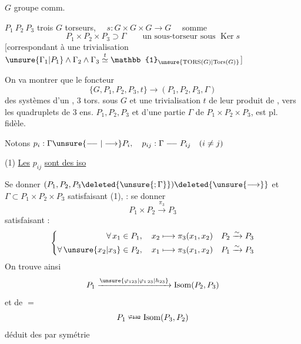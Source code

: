 \(G\) groupe comm.

\(P_1\ P_2\ P_3\) trois \(G\) torseurs, \(\quad s:G\times G\times G\longrightarrow G\quad\)  somme
\[
 P_1\times P_2\times P_3\supset \Gamma\qquad\text{un sous-torseur sous }\operatorname{Ker}s
\]
[correspondant à une trivialisation \(\unsure{\Gamma_1|P_1}\wedge \Gamma_2\wedge \Gamma_3\overset{t}{\simeq}\mathbb{1}_{\unsure{\mathrm{TORS}(G)|\mathrm{Tors}(G)}}\)]

On va montrer que le foncteur
\[
 \{G,P_1,P_2,P_3,t\}\longrightarrow(P_1,P_2,P_3,\Gamma)
\]
 des systèmes d'un  , \(3\) tors.  sous \(G\) et une trivialisation \(t\) de leur produit de , vers les quadruplets de \(3\) ens. \(P_1,P_2,P_3\) et d'une partie \(\Gamma\) de \(P_1\times P_2\times P_3\), est pl. fidèle.

Notons \(p_i:\Gamma\unsure{\relbar\joinrel\relbar|\longrightarrow} P_i,\quad p_{ij}:\Gamma\relbar\joinrel\relbar P_{ij}\quad(i\ne j)\)

(1) \uline{Les} \(p_{ij}\) \uline{sont des iso}

Se donner \((P_1,P_2,P_3\deleted{\unsure{;\Gamma}})\deleted{\unsure{\longrightarrow}}\) et \(\Gamma\subset P_1\times P_2\times P_3\) satisfaisant (1),  : se donner
\[
 P_1\times P_2\xrightarrow{\pi_3}P_3
\]
satisfaisant :
\[
 \left\{\begin{aligned}
 \forall\,x_1\in P_1,\quad x_2&\longmapsto \pi_3(x_1,x_2)& P_2&\xrightarrow{\sim}P_3\\
 \forall\,\unsure{x_2|x_3}\in P_2,\quad x_1&\longmapsto \pi_3(x_1,x_2)& P_1&\xrightarrow{\sim}P_3
 \end{aligned}\right.
\]
On trouve ainsi
\[
 P_1\xrightarrow{\unsure{\varphi_{123}|\varphi_{1\,23}|h_{23}}}\operatorname{Isom}(P_2,P_3)
\]
et de \(=\)
\[
 P_1\overset{\varphi_{132}}{\relbar\joinrel\relbar}\operatorname{Isom}(P_3,P_2)
\]
déduit des  par symétrie
